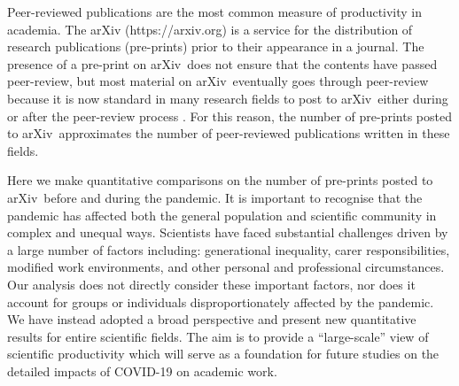 \documentclass[]{rsos}%
\newcommand{\arxiv}{arXiv}
\begin{document}
\maketitle



\noindent Peer-reviewed publications are the most common measure of productivity in academia. The \arxiv\cite{Ginsparg:2011} ({https://arxiv.org}) is a service for the distribution of research publications (pre-prints) prior to their appearance in a journal. The presence of a pre-print on \arxiv\ does not ensure that the contents have passed peer-review, but most material on \arxiv\ eventually goes through peer-review because it is now standard in many research fields to post to \arxiv\ either during or after the peer-review process \cite{Lariviere:2014}. For this reason, the number of pre-prints posted to \arxiv\ approximates the number of peer-reviewed publications written in these fields.


Here we make quantitative comparisons on the number of pre-prints posted to \arxiv\ before and during the pandemic. It is important to recognise that the pandemic has affected both the general population\cite{Nicola:2020,Chu:2020,IbnMohammed:2021} and scientific community\cite{Viglione:2020,Gewen:2020,King:2021} in complex and unequal ways. Scientists have faced substantial challenges driven by a large number of factors including: generational inequality, carer responsibilities, modified work environments, and other personal and professional circumstances. Our analysis does not directly consider these important factors, nor does it account for groups or individuals disproportionately affected by the pandemic. We have instead adopted a broad perspective and present new quantitative results for entire scientific fields. The aim is to provide a “large-scale” view of scientific productivity which will serve as a foundation for future studies on the detailed impacts of COVID-19 on academic work.
\end{document}
